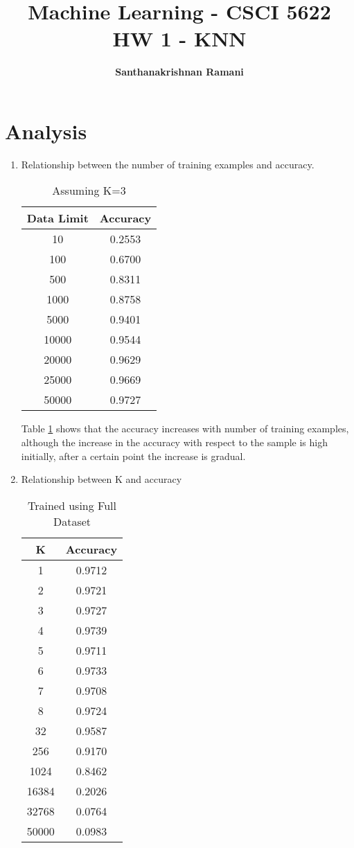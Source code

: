 \documentclass{article}
\date{\displaydate{date}}
\title{\textbf{Machine Learning - CSCI 5622} \\
HW 1 - KNN}
\author{\textbf{Santhanakrishnan Ramani}}
\begin{document}
\maketitle

\section*{Analysis}

\begin{enumerate}
\item
Relationship between the number of training examples and accuracy. 

\begin{table}[h!]
\centering
\begin{tabular}{ |c|c| } 
\hline
Data Limit & Accuracy \\
\hline
10 & 0.2553 \\ 
100 & 0.6700 \\ 
500 & 0.8311 \\
1000 & 0.8758 \\
5000 & 0.9401 \\
10000 & 0.9544 \\
20000 & 0.9629 \\
25000 & 0.9669 \\
50000 & 0.9727 \\ 
\hline
\end{tabular}
\caption{Assuming K=3}
\label{table:1}
\end{table}

Table \ref{table:1} shows that the accuracy increases with number of training examples, although the increase in the accuracy with respect to the sample is high initially, after a certain point the increase is gradual.

\item
Relationship between K and accuracy

\begin{table}[h!]
\centering
\begin{tabular}{ |c|c| } 
\hline
K & Accuracy \\
\hline
1 & 0.9712 \\
2 & 0.9721 \\
3 & 0.9727 \\
4 & 0.9739 \\
5 & 0.9711 \\
6 & 0.9733 \\
7 & 0.9708 \\
8 & 0.9724 \\
32 & 0.9587 \\
256 & 0.9170 \\
1024 & 0.8462 \\
16384 & 0.2026 \\
32768 & 0.0764 \\
50000 & 0.0983 \\
\hline
\end{tabular}
\caption{Trained using Full Dataset}
\label{table:2}
\end{table}


\end{enumerate}
\end{document}
